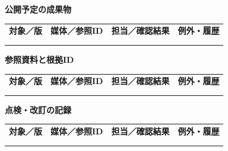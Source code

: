 \documentclass[11pt,a4paper]{article}
\begin{document}
\par{}\noindent\textbf{公開予定の成果物}\par\vspace{1mm}
{\fontsize{8.5}{13}\selectfont
\begin{tabularx}{\linewidth}{@{}XXXX@{}}
\textbf{対象／版} & \textbf{媒体／参照ID} & \textbf{担当／確認結果} & \textbf{例外・履歴}\\[2mm]
\strut & \strut & \strut & \strut\\[5mm]
\strut & \strut & \strut & \strut\\[5mm]
\end{tabularx}
}\vspace{2mm}\par
{}
\par{}\noindent\textbf{参照資料と根拠ID}\par\vspace{1mm}
{\fontsize{8.5}{13}\selectfont
\begin{tabularx}{\linewidth}{@{}XXXX@{}}
\textbf{対象／版} & \textbf{媒体／参照ID} & \textbf{担当／確認結果} & \textbf{例外・履歴}\\[2mm]
\strut & \strut & \strut & \strut\\[5mm]
\strut & \strut & \strut & \strut\\[5mm]
\end{tabularx}
}\vspace{2mm}\par
{}
\par{}\noindent\textbf{点検・改訂の記録}\par\vspace{1mm}
{\fontsize{8.5}{13}\selectfont
\begin{tabularx}{\linewidth}{@{}XXXX@{}}
\textbf{対象／版} & \textbf{媒体／参照ID} & \textbf{担当／確認結果} & \textbf{例外・履歴}\\[2mm]
\strut & \strut & \strut & \strut\\[5mm]
\strut & \strut & \strut & \strut\\[5mm]
\end{tabularx}
}\vspace{2mm}\par
\end{document}
